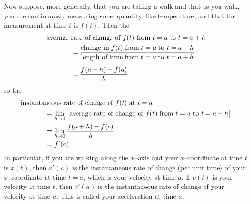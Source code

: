 Now suppose, more generally, that you are taking a walk and that
as you walk, you are continuously measuring some quantity, like temperature,
and that the measurement at time $t$ is $f(t)$. Then the
\begin{align*}
&\text{average rate of change of $f(t)$ from $t=a$ to $t=a+h$} \\
&\hskip0.5in=\frac{\text{change in $f(t)$ from $t=a$ to $t=a+h$}}
       {\text{length of time from $t=a$ to $t=a+h$}} \\[5pt]
&\hskip0.5in=\frac{f(a+h)-f(a)}{h}
\end{align*}
so the
\begin{align*}
&\text{instantaneous rate of change of $f(t)$ at $t=a$} \\
&\hskip0.5in=\lim_{h\rightarrow 0}
\big[\text{average rate of change of $f(t)$ from $t=a$ to $t=a+h$}\big]\\
&\hskip0.5in=\lim_{h\rightarrow 0}\frac{f(a+h)-f(a)}{h} \\
&\hskip0.5in= f'(a)
\end{align*}
In particular, if you are walking along the $x$--axis and your $x$--coordinate
at time $t$ is $x(t)$, then $x'(a)$ is the instantaneous rate of change
(per unit time) of your $x$--coordinate at time $t=a$, which is
your velocity at time $a$. If $v(t)$ is your velocity at time $t$, then
$v'(a)$ is the instantaneous rate of change of your velocity at time
$a$. This is called your acceleration at time $a$.

